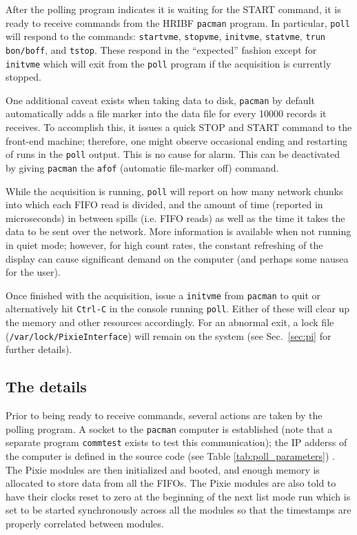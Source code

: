 \documentclass{article}
\begin{document}
After the polling program indicates it is waiting for the \textsc{START} command, it is ready to receive commands from the HRIBF \texttt{pacman} program. In particular, \texttt{poll} will respond to the commands: \texttt{startvme}, \texttt{stopvme}, \texttt{initvme}, \texttt{statvme}, \texttt{trun bon/boff}, and \texttt{tstop}. These respond in the ``expected'' fashion except for \texttt{initvme} which will exit from the \texttt{poll} program if the acquisition is currently stopped.

One additional caveat exists when taking data to disk, \texttt{pacman} by
default automatically adds a file marker into the data file for every 10000
records it receives. To accomplish this, it issues a quick \textsc{STOP} and
\textsc{START} command to the front-end machine; therefore, one might observe
occasional ending and restarting of runs in the \texttt{poll} output. This is
no cause for alarm. This can be deactivated by giving \texttt{pacman} the
\texttt{afof} (automatic file-marker off) command.

While the acquisition is running, \texttt{poll} will report on how many network chunks into which each FIFO read is divided, and the amount of time (reported in microseconds) in between spills (i.e. FIFO reads) as well as the time it takes the data to be sent over the network. More information is available when not running in quiet mode; however, for high count rates, the constant refreshing of the display can cause significant demand on the computer (and perhaps some nausea for the user). 

Once finished with the acquisition, issue a \texttt{initvme} from \texttt{pacman} to quit or alternatively hit \texttt{Ctrl-C} in the console running \texttt{poll}. Either of these will clear up the memory and other resources accordingly. For an abnormal exit, a lock file (\texttt{/var/lock/PixieInterface}) will remain on the system (see Sec.~\ref{sec:pi} for further details).
\subsection{The details}
Prior to being ready to receive commands, several actions are taken by the polling program. A socket to the \texttt{pacman} computer is established (note that a separate program \texttt{commtest} exists to test this communication); the IP adderss of the computer is defined in the source code (see Table \ref{tab:poll_parameters}) . The Pixie modules are then initialized and booted, and enough memory is allocated to store data from all the FIFOs. The Pixie modules are also told to have their clocks reset to zero at the beginning of the next list mode run which is set to be started synchronously across all the modules so that the timestamps are properly correlated between modules.
\end{document}
